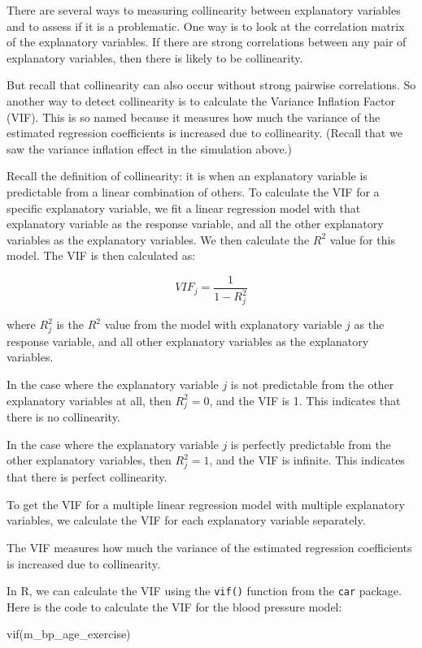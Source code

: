 \documentclass[
  letterpaper,
  8pt,
  a4paper]{book}
\newenvironment{Shaded}{\begin{snugshade}}{\end{snugshade}}
\newcommand{\FunctionTok}[1]{\textcolor[rgb]{0.28,0.35,0.67}{#1}}
\newcommand{\NormalTok}[1]{\textcolor[rgb]{0.00,0.23,0.31}{#1}}
\begin{document}
There are several ways to measuring collinearity between explanatory
variables and to assess if it is a problematic. One way is to look at
the correlation matrix of the explanatory variables. If there are strong
correlations between any pair of explanatory variables, then there is
likely to be collinearity.

But recall that collinearity can also occur without strong pairwise
correlations. So another way to detect collinearity is to calculate the
Variance Inflation Factor (VIF). This is so named because it measures
how much the variance of the estimated regression coefficients is
increased due to collinearity. (Recall that we saw the variance
inflation effect in the simulation above.)

Recall the definition of collinearity: it is when an explanatory
variable is predictable from a linear combination of others. To
calculate the VIF for a specific explanatory variable, we fit a linear
regression model with that explanatory variable as the response
variable, and all the other explanatory variables as the explanatory
variables. We then calculate the \(R^2\) value for this model. The VIF
is then calculated as:

\[VIF_j = \frac{1}{1 - R^2_j}\]

where \(R^2_j\) is the \(R^2\) value from the model with explanatory
variable \(j\) as the response variable, and all other explanatory
variables as the explanatory variables.

In the case where the explanatory variable \(j\) is not predictable from
the other explanatory variables at all, then \(R^2_j = 0\), and the VIF
is 1. This indicates that there is no collinearity.

In the case where the explanatory variable \(j\) is perfectly
predictable from the other explanatory variables, then \(R^2_j = 1\),
and the VIF is infinite. This indicates that there is perfect
collinearity.

To get the VIF for a multiple linear regression model with multiple
explanatory variables, we calculate the VIF for each explanatory
variable separately.

The VIF measures how much the variance of the estimated regression
coefficients is increased due to collinearity.

In R, we can calculate the VIF using the \texttt{vif()} function from
the \texttt{car} package. Here is the code to calculate the VIF for the
blood pressure model:

\begin{Shaded}
\begin{Highlighting}[]
\FunctionTok{vif}\NormalTok{(m\_bp\_age\_exercise)}
\end{Highlighting}
\end{Shaded}
\end{document}
